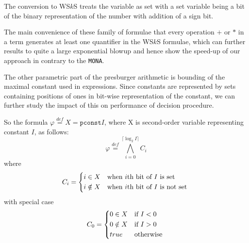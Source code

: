 The conversion to WS$k$S treats the variable as set with a set variable being a
bit of the binary representation of the number with addition of a sign bit.

The main convenience of these family of formulae that every operation $+$ or $*$
in a term generates at least one quantifier in the WS$k$S formulae, which can
further results to quite a large exponential blowup and hence show the speed-up
of our approach in contrary to the \texttt{MONA}.

The other parametric part of the presburger arithmetic is bounding of the
maximal constant used in expressions. Since constants are represented by sets
containing positions of ones in bit-wise representation of the constant, we can
further study the impact of this on performance of decision procedure.

So the formula $\varphi \overset{\mathit{def}}{=} X = \mathtt{pconst}{I}$, where
X is second-order variable representing constant $I$, as follows:
\begin{equation}
 \varphi \overset{\mathit{def}}{=} \bigwedge_{i = 0}^{\lceil \log_2 I\rceil} C_i
\end{equation}
where
\begin{equation}
  C_i = \begin{dcases*}
         i \in X  & when $i$th bit of $I$ is set\\
         i \notin X & when $i$th bit of $I$ is not set
         \end{dcases*}
\end{equation}
with special case
\begin{equation}
  C_0 = \begin{dcases*}
          0 \in X  & if $I < 0$\\
         0 \notin X & if $I > 0$\\
         true & otherwise
         \end{dcases*}
\end{equation}

